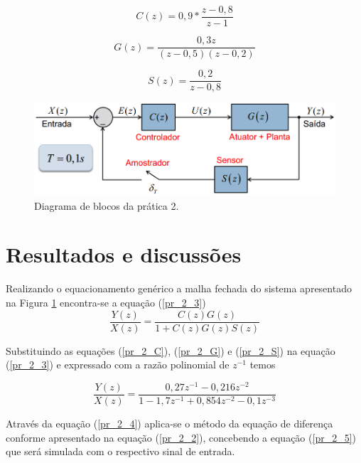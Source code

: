\begin{equation}
C(z) = 0,9*\frac{z-0,8}{z-1}
\label{pr_2_C}
\end{equation}

\begin{equation}
	G(z) = \frac{0,3z}{(z-0,5)(z-0,2)}
    \label{pr_2_G}
\end{equation}

\begin{equation}
	S(z) = \frac{0,2}{z-0,8}
    \label{pr_2_S}
\end{equation}

\begin{figure}[!th]
	\centering
    \includegraphics[scale = .5]{Imagens/Execicio1_pr2.PNG}
    \caption{Diagrama de blocos da prática 2.}
    \label{fig:pr2_esquema}
\end{figure}

\section{Resultados e discussões}

Realizando o equacionamento genérico a malha fechada do sistema apresentado na Figura \ref{fig:pr2_esquema} encontra-se a equação (\ref{pr_2_3})  
\begin{equation}
\frac{Y(z)}{X(z)} = \frac{C(z)G(z)}{1 + C(z)G(z)S(z)}
\label{pr_2_3}
\end{equation}

Substituindo as equações (\ref{pr_2_C}), (\ref{pr_2_G}) e (\ref{pr_2_S}) na equação (\ref{pr_2_3}) e expressado com a razão polinomial de $z^{-1 }$ temos

\begin{equation}
\frac{Y(z)}{X(z)} = \frac{0,27z^{-1} - 0,216z^{-2}}{1 - 1,7z^{-1} + 0,854z^{-2} - 0,1z^{-3}}
\label{pr_2_4}
\end{equation}

Através da equação (\ref{pr_2_4}) aplica-se o método da equação de diferença conforme apresentado na equação (\ref{pr_2_2}), concebendo a equação (\ref{pr_2_5}) que será simulada com o respectivo sinal de entrada.

